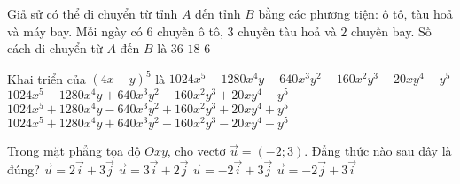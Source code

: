 \begin{ex}%
	Giả sử có thể di chuyển từ tỉnh $A$ đến tỉnh $B$ bằng các phương tiện: ô tô, tàu hoả và máy bay. Mỗi ngày có $6$ chuyến ô tô, $3$ chuyến tàu hoả và $2$ chuyến bay. Số cách di chuyển từ $A$ đến $B$ là
	{$36$}
	{ $18$}
	{$6$}
\end{ex}
\begin{ex}%
	Khai triển của $(4x-y)^5$ là
	\choice
	{$1024x^5-1280x^4y-640x^3y^2-160x^2y^3-20xy^4-y^5$}
	{\True $1024x^5-1280x^4y+640x^3y^2-160x^2y^3+20xy^4-y^5$}
	{$1024x^5+1280x^4y-640x^3y^2+160x^2y^3+20xy^4+y^5$}
	{$1024x^5+1280x^4y+640x^3y^2-160x^2y^3-20xy^4-y^5$}
\end{ex}
\begin{ex}%
	Trong mặt phẳng tọa độ $Oxy$, cho vectơ $\vec{u}=(-2 ; 3)$. Đẳng thức nào sau đây là đúng?
	\choice
	{$\vec{u}=2 \vec{i}+3 \vec{j}$}
	{$\vec{u}=3 \vec{i}+2 \vec{j}$}
	{\True $\vec{u}=-2 \vec{i}+3 \vec{j}$}
	{$\vec{u}=-2 \vec{j}+3 \vec{i}$}
	\loigiai{}
\end{ex}

